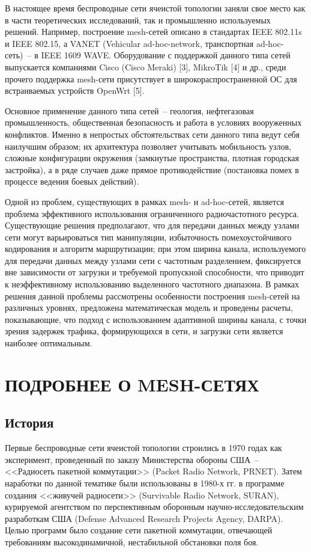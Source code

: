 \documentclass[14pt,a4paper,titlepage]{extarticle}
\begin{document}
В настоящее время беспроводные сети ячеистой топологии заняли свое место как в части теоретических исследований, так и промышленно используемых решений. Например, построение mesh-сетей описано в стандартах IEEE 802.11s и IEEE 802.15, а VANET (Vehicular ad-hoc-network, транспортная ad-hoc-сеть)~-- в IEEE 1609 WAVE. Оборудование с поддержкой данного типа сетей выпускается компаниями Cisco (Cisco Meraki) [3], MikroTik [4] и др., среди прочего поддержка mesh-сети присутствует в широкораспространенной ОС для встраиваемых устройств OpenWrt [5].

Основное применение данного типа сетей~-- геология, нефтегазовая промышленность, общественная безопасность и работа в условиях вооруженных конфликтов. Именно в непростых обстоятельствах сети данного типа ведут себя наилучшим образом; их архитектура позволяет учитывать мобильность узлов, сложные конфигурации окружения (замкнутые пространства, плотная городская застройка), а в ряде случаев даже прямое противодействие (постановка помех в процессе ведения боевых действий).

Одной из проблем, существующих в рамках mesh- и ad-hoc-сетей, является проблема эффективного использования ограниченного радиочастотного ресурса. Существующие решения предполагают, что для передачи данных между узлами сети могут варьироваться тип манипуляции, избыточность помехоустойчивого кодирования и алгоритм маршрутизации; при этом ширина канала, используемого для передачи данных между узлами сети с частотным разделением, фиксируется вне зависимости от загрузки и требуемой пропускной способности, что приводит к неэффективному использованию выделенного частотного диапазона. В рамках решения данной проблемы рассмотрены особенности построения mesh-сетей на различных уровнях, предложена математическая модель и проведены расчеты, показывающие, что подход с использованием адаптивной ширины канала, с точки зрения задержек трафика, формирующихся в сети, и загрузки сети является наиболее оптимальным.

\section{ПОДРОБНЕЕ О MESH-СЕТЯХ}
\subsection{История}
Первые беспроводные сети ячеистой топологии строились в 1970 годах как эксперимент, проведенный по заказу Министерства обороны США~-- <<Радиосеть пакетной коммутации>> (Packet Radio Network, PRNET). Затем наработки по данной тематике были использованы в 1980-х гг. в программе создания <<живучей радиосети>> (Survivable Radio Network, SURAN), курируемой агентством по перспективным оборонным научно-исследовательским разработкам США (Defense Advanced Research Projects Agency, DARPA). Целью программ было создание сети пакетной коммутации, отвечающей требованиям высокодинамичной, нестабильной обстановки поля боя.
\end{document}
